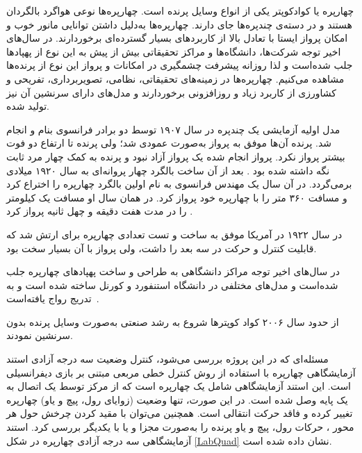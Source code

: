 


چهارپره یا کوادکوپتر یکی از انواع وسایل پرنده است. چهارپره‌ها نوعی هواگرد بالگردان هستند و در دسته‌ی چندپره‌ها جای دارند.
  چهارپره‌ها به‌دلیل داشتن توانایی مانور خوب و امکان پرواز ایستا با تعادل بالا از کاربردهای بسیار گسترده‌ای برخوردارند.
در سال‌های اخیر توجه شرکت‌ها، دانشگاه‌ها و مراکز تحقیقاتی بیش از پیش به این نوع از پهپادها جلب شده‌است و لذا روزانه پیشرفت چشمگیری
 در امکانات و پرواز این نوع از پرنده‌ها مشاهده می‌کنیم. چهارپره‌ها در زمینه‌های تحقیقاتی، نظامی، تصویربرداری، تفریحی و کشاورزی از کاربرد زیاد و روزافزونی برخوردارند و مدل‌های دارای سرنشین آن نیز تولید شده‌.





مدل‬ اولیه آزمایشی یک چندپره در سال ۱۹۰۷ توسط دو برادر فرانسوی بنام
  و 
  انجام شد. پرنده آن‌ها موفق به پرواز به‌صورت عمودی شد؛ ولی پرنده تا ارتفاع دو فوت بیشتر پرواز نکرد. پرواز انجام شده یک پرواز آزاد
  نبود و پرنده به کمک چهار مرد ثابت نگه داشته شده بود \cite{Sprekelmeyer}.
  بعد از آن ساخت بالگرد چهار پروانه‌ای به سال ۱۹۲۰ میلادی برمی‌گردد. در آن سال یک مهندس فرانسوی به نام  اولین بالگرد چهارپره را اختراع کرد و مسافت ۳۶۰ متر را با چهارپره خود پرواز کرد. در همان سال او مسافت یک کیلومتر را در مدت هفت دقیقه و چهل ثانیه پرواز کرد \cite{10.2307/44729509}.

در  سال ۱۹۲۲ در آمریکا  موفق به ساخت و تست تعدادی چهارپره برای ارتش شد که قابلیت کنترل و حرکت در سه بعد را داشت، ولی پرواز با آن بسیار سخت بود.

در سال‌های اخیر توجه مراکز دانشگاهی به طراحی و ساخت پهپادهای چهارپره جلب شده‌است و مدل‌های مختلفی در دانشگاه استنفورد و کورنل ساخته شده است و به تدریج رواج یافته‌است~\cite{5717652}.

از حدود سال ۲۰۰۶ کواد کوپترها شروع به رشد صنعتی به‌صورت وسایل پرنده بدون سرنشین نمودند.


مسئله‌ای که در این پروژه بررسی می‌شود، کنترل وضعیت سه درجه آزادی استند آزمایشگاهی چهارپره با استفاده از روش کنترل خطی مربعی مبتنی بر بازی دیفرانسیلی است. این استند آزمایشگاهی شامل یک چهارپره است که از 
مرکز توسط یک اتصال به یک پایه وصل شده است. در این صورت، تنها وضعیت (زوایای رول، پیچ و یاو) 
چهارپره تغییر کرده و فاقد حرکت انتقالی است. همچنین می‌توان با مقید کردن چرخش حول هر محور ، 
حرکات رول، پیچ و یاو  پرنده را به‌صورت مجزا و یا با یکدیگر بررسی کرد.
استند آزمایشگاهی سه درجه آزادی چهارپره در شکل \ref{LabQuad} نشان داده شده ‌است.

